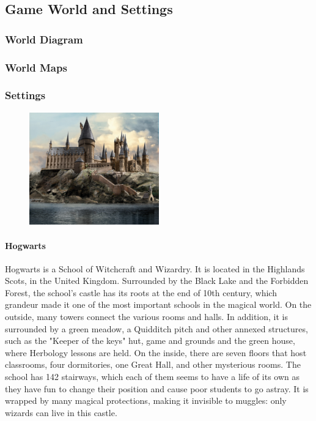 \subsection*{Game World and Settings}

\subsubsection*{World Diagram}


\subsubsection*{World Maps}


\subsubsection*{Settings}

\begin{figure}
\centering
\includegraphics[max width=0.5\textwidth]{../Pictures/Locations/Hogwarts/Castle_picture.png}
\end{figure}
\paragraph{Hogwarts}
Hogwarts is a School of Witchcraft and Wizardry. It is located in the Highlands Scots, in the United Kingdom. Surrounded by the Black Lake and the Forbidden Forest, the school's castle has its roots at the end of 10th century, which grandeur made it one of the most important schools in the magical world. On the outside, many towers connect the various rooms and halls. In addition, it is surrounded by a green meadow, a Quidditch pitch and other annexed structures, such as the "Keeper of the keys" hut, game and grounds and the green house, where Herbology lessons are held. On the inside, there are seven floors that host classrooms, four dormitories, one Great Hall, and other mysterious rooms. The school has 142 stairways, which each of them seems to have a life of its own as they have fun to change their position and cause poor students to go astray. It is wrapped by many magical protections, making it invisible to muggles: only wizards can live in this castle. 

